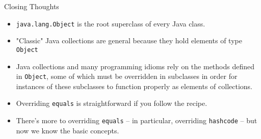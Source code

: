 \documentclass{beamer}
\begin{document}
\begin{frame}[fragile]{Closing Thoughts}

\begin{itemize}
\item {\tt java.lang.Object} is the root superclass of every Java class.
\item "Classic" Java collections are general because they hold elements of type {\tt Object}
\item Java collections and many programming idioms rely on the methods defined in {\tt Object}, some of which must be overridden in subclasses in order for instances of these subclasses to function properly as elements of collections.
\item Overriding {\tt equals} is straightforward if you follow the recipe.
\item There's more to overriding {\tt equals} -- in particular, overriding {\tt hashcode} -- but now we know the basic concepts.
\end{itemize}

\end{frame}








\end{document}
